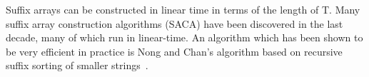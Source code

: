 \begin{table}
	\begin{center}
		\hspace{1cm}
		\hspace{1cm}
        \caption{$T=\text{BANANA\$}$}
        \label{table:BANANA}
	\end{center}
\end{table}


Suffix arrays can be constructed in linear time in terms of the length of T. Many suffix
array construction algorithms (SACA) have been discovered in the last
decade\cite{SuffixArrayConstruction}, many of which run in linear-time. An algorithm which
has been shown to be very efficient in practice is Nong and Chan's algorithm based on
recursive suffix sorting of smaller strings~\cite{LinearTimeSuffixArraySAIS}. 


